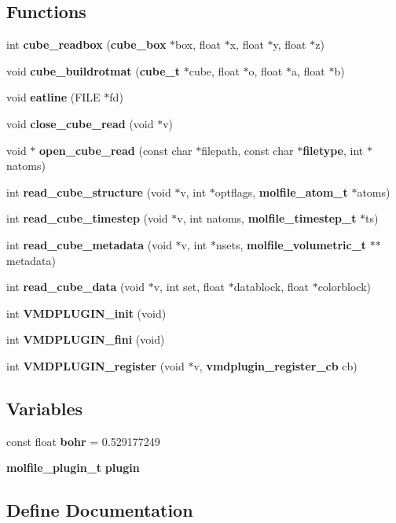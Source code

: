 \subsection*{Functions}
\begin{CompactItemize}
\item 
int {\bf cube\_\-readbox} ({\bf cube\_\-box} $\ast$box, float $\ast$x, float $\ast$y, float $\ast$z)
\item 
void {\bf cube\_\-buildrotmat} ({\bf cube\_\-t} $\ast$cube, float $\ast$o, float $\ast$a, float $\ast$b)
\item 
void {\bf eatline} (FILE $\ast$fd)
\item 
void {\bf close\_\-cube\_\-read} (void $\ast$v)
\item 
void $\ast$ {\bf open\_\-cube\_\-read} (const char $\ast$filepath, const char $\ast${\bf filetype}, int $\ast$natoms)
\item 
int {\bf read\_\-cube\_\-structure} (void $\ast$v, int $\ast$optflags, {\bf molfile\_\-atom\_\-t} $\ast$atoms)
\item 
int {\bf read\_\-cube\_\-timestep} (void $\ast$v, int natoms, {\bf molfile\_\-timestep\_\-t} $\ast$ts)
\item 
int {\bf read\_\-cube\_\-metadata} (void $\ast$v, int $\ast$nsets, {\bf molfile\_\-volumetric\_\-t} $\ast$$\ast$metadata)
\item 
int {\bf read\_\-cube\_\-data} (void $\ast$v, int set, float $\ast$datablock, float $\ast$colorblock)
\item 
int {\bf VMDPLUGIN\_\-init} (void)
\item 
int {\bf VMDPLUGIN\_\-fini} (void)
\item 
int {\bf VMDPLUGIN\_\-register} (void $\ast$v, {\bf vmdplugin\_\-register\_\-cb} cb)
\end{CompactItemize}
\subsection*{Variables}
\begin{CompactItemize}
\item 
const float {\bf bohr} = 0.529177249
\item 
{\bf molfile\_\-plugin\_\-t} {\bf plugin}
\end{CompactItemize}


\subsection{Define Documentation}
